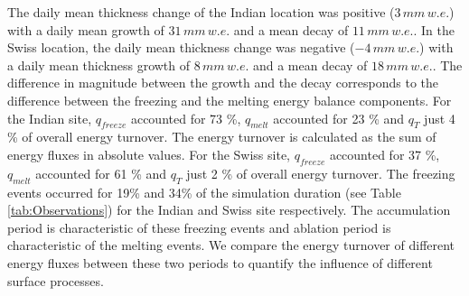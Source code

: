 \documentclass[utf8]{frontiersSCNS}
\begin{document}
The daily mean thickness change of the Indian location was positive ($3\, mm \,w.e.$) with a daily mean growth
of $31\, mm \,w.e.$ and a mean decay of $11\, mm \,w.e.$. In the Swiss location, the daily mean
thickness change was negative ($-4\, mm \,w.e.$) with a daily mean thickness growth of $8\, mm \,w.e.$ and a
mean decay of $18\, mm \,w.e.$. The difference in magnitude between the growth and the decay corresponds to the
difference between the freezing and the melting energy balance components. For the Indian site, $q_{freeze}$
accounted for 73 \%, $q_{melt}$ accounted for 23 \% and $q_{T}$ just 4 \% of overall energy turnover. The energy
turnover is calculated as the sum of energy fluxes in absolute values. For the Swiss site, $q_{freeze}$
accounted for 37 \%, $q_{melt}$ accounted for 61 \%  and $q_{T}$ just 2 \% of overall energy turnover. The
freezing events occurred for 19\% and 34\% of the simulation duration (see Table \ref{tab:Observations}) for the
Indian and Swiss site respectively. The accumulation period is characteristic of these freezing events and
ablation period is characteristic of the melting events. We compare the energy turnover of different energy
fluxes between these two periods to quantify the influence of different surface processes.
\end{document}

